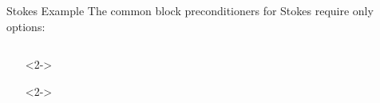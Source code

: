 \begin{frame}[fragile]{Stokes Example}
The common block preconditioners for Stokes require only options:
\begin{columns}
\begin{column}[c]{0.74\textwidth}
\begin{itemize}
  \item[]<2-> 
  \item[]<2-> 

\end{itemize}
\end{column}
\end{columns}
\end{frame}
